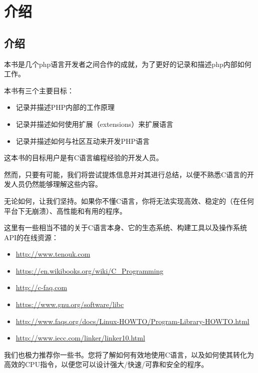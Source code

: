 \chapter{介绍}

\label{chap:introduction}

\section{介绍}

本书是几个php语言开发者之间合作的成就，为了更好的记录和描述php内部如何工作。

本书有三个主要目标：
\begin{itemize}
    \item 记录并描述PHP内部的工作原理
    \item 记录并描述如何使用扩展（extensions）来扩展语言
    \item 记录并描述如何与社区互动来开发PHP语言
\end{itemize}

这本书的目标用户是有C语言编程经验的开发人员。

然而，只要有可能，我们将尝试提炼信息并对其进行总结，以便不熟悉C语言的开发人员仍然能够理解这些内容。

无论如何，让我们坚持。如果你不懂C语言，你将无法实现高效、稳定的（在任何平台下无崩溃）、高性能和有用的程序。

这里有一些相当不错的关于C语言本身、它的生态系统、构建工具以及操作系统API的在线资源：

\begin{itemize}
    \item \url{http://www.tenouk.com}
    \item \url{https://en.wikibooks.org/wiki/C_Programming}
    \item \url{http://c-faq.com}
    \item \url{https://www.gnu.org/software/libc}
    \item \url{http://www.faqs.org/docs/Linux-HOWTO/Program-Library-HOWTO.html}
    \item \url{http://www.iecc.com/linker/linker10.html}
\end{itemize}

我们也极力推荐你一些书。您将了解如何有效地使用C语言，以及如何使其转化为高效的CPU指令，以便您可以设计强大/快速/可靠和安全的程序。

